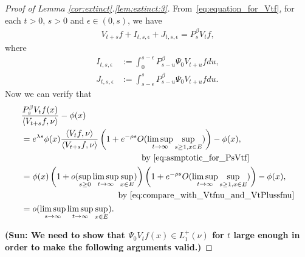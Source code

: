 \documentclass[12pt,a4paper]{amsart}
\numberwithin{equation}{section}
\theoremstyle{plain}
\theoremstyle{definition}
\begin{document}
\begin{proof}[Proof of Lemma \ref{cor:extinct}.\eqref{lem:extinct:3}]
From~\eqref{eq:equation_for_Vtf}, for each $t>0$, $s>0$ and $\epsilon \in (0,s)$, we have
\begin{align}
\label{eq:Vf_plus_I_plus_J_equals_PF}
  V_{t+s} f + I_{t,s,\epsilon} + J_{t,s,\epsilon}= P_s^\beta V_tf,
\end{align}
where
\begin{align}
I_{t,s,\epsilon}
&:= \int_0^{s-\epsilon} P_{s-u}^\beta \Psi_0 V_{t+u}f du,
\label{eq:definition_of_Its_epsilon}
\\ J_{t,s,\epsilon}
&:= \int_{s-\epsilon}^s P_{s-u}^\beta \Psi_0 V_{t+u}f du.
\label{eq:definition_of_Jtsepsilon}
\end{align}
Now we can verify that 
\begin{align}
  &\frac{ P_s^\beta V_tf(x)}{\left\langle V_{t+s} f,\nu \right\rangle } - \phi(x)
\\& \begin{multlined}= e^{\lambda s} \phi(x)\frac{  \left\langle V_tf,\nu \right\rangle   }{\left\langle V_{t+s}f,\nu \right\rangle } \left( 1+ e^{-\rho s} O(\limsup_{t\to \infty}\sup_{s\geq 1, x\in E}) \right)- \phi(x),
\\ \text{by~\eqref{eq:asmptotic_for_PsVtf}} \end{multlined}
  \\ &\begin{multlined} = \phi(x) \left( 1+o(\sup_{s \geq 0} \limsup_{t\to \infty} \sup_{x\in E}) \right)  \left( 1+ e^{-\rho s} O(\limsup_{t\to \infty}\sup_{s\geq 1, x\in E}) \right)- \phi(x),
\\ \text{by~\eqref{eq:compare_with_Vtfnu_and_VtPlussfnu}} \end{multlined}
\\&= o(\limsup_{s\to \infty}\limsup_{t\to \infty} \sup_{x\in E}). 
\label{eq:9}
\end{align}

{\bf (Sun: We need to show that $\Psi_0 V_tf(x) \in L_1^+(\nu)$ for $t$ large enough in order to make the following arguments valid.)}


\end{proof}
\end{document}
